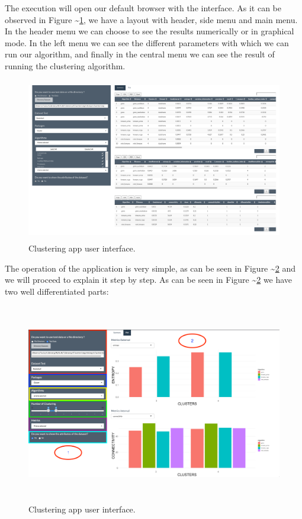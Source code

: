 \documentclass[
]{article}
\begin{document}
The execution will open our default browser with the interface. As it
can be observed in Figure \textasciitilde{}\ref{layoutApp}, we have a
layout with header, side menu and main menu. In the header menu we can
choose to see the results numerically or in graphical mode. In the left
menu we can see the different parameters with which we can run our
algorithm, and finally in the central menu we can see the result of
running the clustering algorithm.

\begin{figure}
\centering
\includegraphics[width=\textwidth,height=2.8125in]{img/app}
\caption{Clustering app user interface. \label{layoutApp}}
\end{figure}

The operation of the application is very simple, as can be seen in
Figure \textasciitilde{}\ref{app1} and we will proceed to explain it
step by step. As can be seen in Figure \textasciitilde{}\ref{app1} we
have two well differentiated parts:

\begin{figure}
\centering
\includegraphics[width=\textwidth,height=3.4375in]{img/app1}
\caption{Clustering app user interface. \label{app1}}
\end{figure}
\end{document}
